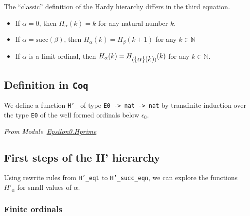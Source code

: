 \begin{remark}
 The ``classic'' definition of the Hardy hierarchy differs in the third equation.

\begin{itemize}
\item If $\alpha=0$, then $H_\alpha (k)= k$ for any natural number $k$.
\item If $\alpha=\textrm{succ}(\beta)$, then 
$H_\alpha(k)=H_\beta(k+1)$ for any $k \in \mathbb{N}$
\item If $\alpha$ is a limit ordinal, then 
$H_\alpha(k) = H_{(\mbox{$\{\alpha\}(k)$})}(k)$ for any $k\in \mathbb{N}$.
\end{itemize}

\end{remark}

\subsection{Definition in \texttt{Coq}}


We define a function \texttt{H'\_} of type \texttt{E0 -> nat -> nat} by transfinite induction over the type \texttt{E0} of the well formed ordinals below $\epsilon_0$.

\vspace{4pt}
\emph{From Module~\href{../theories/html/hydras.Epsilon0.Hprime.html\#H_}{Epsilon0.Hprime}}

\label{Functions:Hprime-alpha}



 







\subsection{First  steps of the H' hierarchy}
Using rewrite rules from \texttt{H'\_eq1} to \texttt{H'\_succ\_eqn}, we can explore the functions $H'_\alpha$ for  small values of $\alpha$.


\subsubsection{Finite ordinals} 

